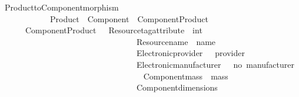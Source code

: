 \begin{isabellebody}
\begin{isamarkuptext}
\begin{isarbox}
\begin{isabelle}
\ Product{\isacharunderscore}{\kern0pt}to{\isacharunderscore}{\kern0pt}Component{\isacharunderscore}{\kern0pt}morphism\ {\isacharcolon}{\kern0pt}{\isacharcolon}{\kern0pt}\ \isanewline
\ \ \ \ \ \ \ \ \ \ \ \ {\isachardoublequoteopen}Product\ {\isasymRightarrow}\ Component{\isachardoublequoteclose}\ {\isacharparenleft}{\kern0pt}{\isachardoublequoteopen}{\isacharunderscore}{\kern0pt}\ {\isasymlangle}Component{\isasymrangle}\isactrlsub P\isactrlsub r\isactrlsub o\isactrlsub d\isactrlsub u\isactrlsub c\isactrlsub t{\isachardoublequoteclose}\ {\isacharbrackleft}{\kern0pt}{}{}{}{}{\isacharbrackright}{\kern0pt}{}{}{}{\isacharparenright}{\kern0pt}\isanewline
\ \ \ {\isachardoublequoteopen}\ \ {\isasymsigma}\ {\isasymlangle}Component{\isasymrangle}\isactrlsub P\isactrlsub r\isactrlsub o\isactrlsub d\isactrlsub u\isactrlsub c\isactrlsub t\ {\isacharequal}{\kern0pt}\ {\isasymlparr}\ Resource{\isachardot}{\kern0pt}tag{\isacharunderscore}{\kern0pt}attribute\ {\isacharequal}{\kern0pt}\ {}{\isacharcolon}{\kern0pt}{\isacharcolon}{\kern0pt}int\ {\isacharcomma}{\kern0pt}\isanewline
\ \ \ \ \ \ \ \ \ \ \ \ \ \ \ \ \ \ \ \ \ \ \ \ \ \ \ \ \ \ \ \ \ Resource{\isachardot}{\kern0pt}name\ {\isacharequal}{\kern0pt}\ name\ {\isasymsigma}\ {\isacharcomma}{\kern0pt}\isanewline
\ \ \ \ \ \ \ \ \ \ \ \ \ \ \ \ \ \ \ \ \ \ \ \ \ \ \ \ \ \ \ \ \ Electronic{\isachardot}{\kern0pt}provider\ \ {\isacharequal}{\kern0pt}\ provider\ {\isasymsigma}\ {\isacharcomma}{\kern0pt}\isanewline
\ \ \ \ \ \ \ \ \ \ \ \ \ \ \ \ \ \ \ \ \ \ \ \ \ \ \ \ \ \ \ \ \ Electronic{\isachardot}{\kern0pt}manufacturer\ \ {\isacharequal}{\kern0pt}\ {\isacharprime}{\kern0pt}{\isacharprime}{\kern0pt}no\ manufacturer{\isacharprime}{\kern0pt}{\isacharprime}{\kern0pt}\ {\isacharcomma}{\kern0pt}\isanewline
\ \ \ \ \ \ \ \ \ \ \ \ \ \ \ \ \ \ \ \ \ \ \ \ \ \ \ \ \ \ \ \ \ Component{\isachardot}{\kern0pt}mass\ {\isacharequal}{\kern0pt}\ mass\ {\isasymsigma}\ {\isacharcomma}{\kern0pt}\isanewline
\ \ \ \ \ \ \ \ \ \ \ \ \ \ \ \ \ \ \ \ \ \ \ \ \ \ \ \ \ \ \ \ \ Component{\isachardot}{\kern0pt}dimensions\ {\isacharequal}{\kern0pt}\ {\isacharbrackleft}{\kern0pt}{\isacharbrackright}{\kern0pt}\ {\isasymrparr}{\isachardoublequoteclose}
\end{isabelle}
\end{isarbox} 


\begin{isarbox}


\end{isarbox}
\end{isamarkuptext}
\end{isabellebody}
